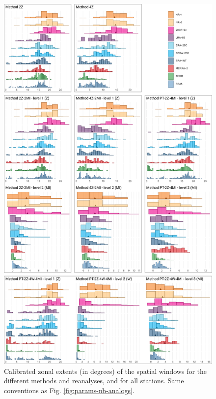 \documentclass[alpha-refs]{wiley-article}
\begin{document}
\begin{figure}[btp]
	\centering
	\includegraphics[width=115mm]{figure-7.pdf}
	\caption{Calibrated zonal extents (in degrees) of the spatial windows for the different methods and reanalyses, and for all stations. Same conventions as Fig. \protect\ref{fig:params-nb-analogs}.}
	\label{fig:params-xwidth}
\end{figure}
\end{document}
